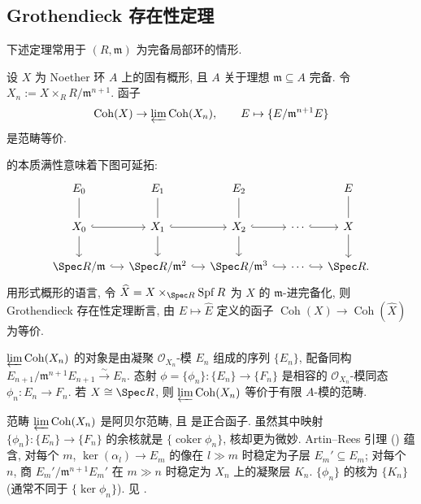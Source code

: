 \subsection{Grothendieck 存在性定理}\label{src:C.5.2-subsection}
下述定理常用于 $(R,\mathfrak m)$ 为完备局部环的情形.
\begin{theorem}\label{src:C.5.3}
设 $X$ 为 Noether 环 $A$ 上的固有概形, 且 $A$ 关于理想 $\mathfrak m\subseteq A$ 完备. 令 $X_n:=X\times_RR/\mathfrak m^{n+1}$. 函子
\begin{equation}\label{src:C.5.4}
\operatorname{Coh}(X)\to\varprojlim\operatorname{Coh}(X_n),\qquad E\mapsto\{E/\mathfrak m^{n+1}E\}
\end{equation}
是范畴等价.
\end{theorem}
 的本质满性意味着下图可延拓:
\[
\begin{tikzcd}[column sep=small]
E_0\arrow[d,no head]&E_1\arrow[d,no head]&E_2\arrow[d,no head]&&E\arrow[d,no head]\\
X_0\arrow[r,hook]\arrow[d]&X_1\arrow[r,hook]\arrow[d]&X_2\arrow[r,hook]\arrow[d]&\cdots\arrow[r,hook]&X\arrow[d]\\
\Spec R/\mathfrak m\arrow[r,hook]&\Spec R/\mathfrak m^2\arrow[r,hook]&\Spec R/\mathfrak m^3\arrow[r,hook]&\cdots\arrow[r,hook]&\Spec R.
\end{tikzcd}
\]
用形式概形的语言, 令 $\widehat X=X\times_{\Spec R}\operatorname{Spf} R$ 为 $X$ 的 $\mathfrak m$-进完备化, 则 Grothendieck 存在性定理断言, 由 $E\mapsto\widehat E$ 定义的函子 $\operatorname{Coh}(X)\to\operatorname{Coh}(\widehat X)$ 为等价.
\begin{remark}[范畴的极限]\label{src:C.5.5}
$\varprojlim\operatorname{Coh}(X_n)$ 的对象是由凝聚 $\mathcal O_{X_n}$-模 $E_n$ 组成的序列 $\{E_n\}$, 配备同构 $E_{n+1}/\mathfrak m^{n+1}E_{n+1}\xrightarrow\sim E_n$. 态射 $\phi=\{\phi_n\}:\{E_n\}\to\{F_n\}$ 是相容的 $\mathcal O_{X_n}$-模同态 $\phi_n:E_n\to F_n$. 若 $X\cong\Spec R$, 则 $\varprojlim\operatorname{Coh}(X_n)$ 等价于有限 $A$-模的范畴.

范畴 $\varprojlim\operatorname{Coh}(X_n)$ 是阿贝尔范畴, 且  是正合函子. 虽然其中映射 $\{\phi_n\}:\{E_n\}\to\{F_n\}$ 的余核就是 $\{\operatorname{coker}\phi_n\}$, 核却更为微妙. Artin--Rees 引理 () 蕴含, 对每个 $m$, $\ker(\alpha_l)\to E_m$ 的像在 $l\gg m$ 时稳定为子层 $E_m'\subseteq E_m$; 对每个 $n$, 商 $E_m'/\mathfrak m^{n+1}E_m'$ 在 $m\gg n$ 时稳定为 $X_n$ 上的凝聚层 $K_n$. $\{\phi_n\}$ 的核为 $\{K_n\}$ (通常不同于 $\{\ker\phi_n\}$). 见 \cite[Tag 0EHN]{SP}.
\end{remark}
